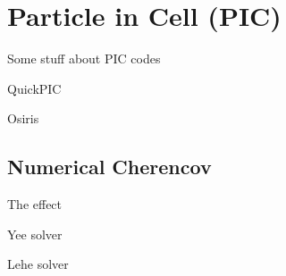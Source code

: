 %
%

\chapter{Particle in Cell (PIC)}
\label{Apx:PIC}

Some stuff about PIC codes

QuickPIC \cite{an:2013, huang:2006}

Osiris \cite{fonseca:2002}

\section{Numerical Cherencov}
\label{PIC:NumCher}

The effect \cite{godfrey:1974, greenwood:2004}

Yee solver \cite{yee:1966}

Lehe solver \cite{lehe:2013}
